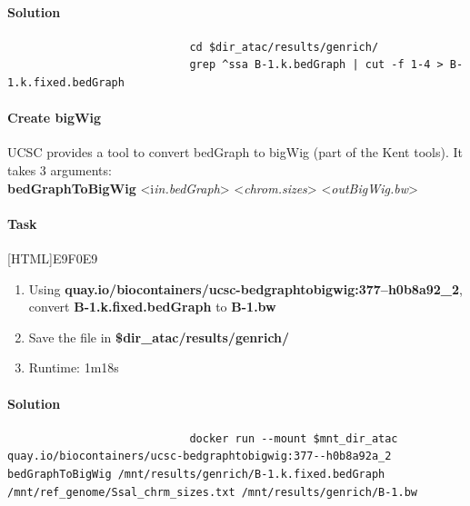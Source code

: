 \documentclass[12pt]{article}
\begin{document}
				\paragraph{Solution}
					
					\begin{minipage}{\linewidth}
						\begin{lstlisting}
							cd $dir_atac/results/genrich/
							grep ^ssa B-1.k.bedGraph | cut -f 1-4 > B-1.k.fixed.bedGraph
						\end{lstlisting}
					\end{minipage}
					
					
			\paragraph{Create bigWig}
					UCSC provides a tool to convert bedGraph to bigWig (part of the Kent tools). It takes 3 arguments:\\
					
					 \textbf{bedGraphToBigWig} <i\textit{in.bedGraph}> <\textit{chrom.sizes}> <\textit{outBigWig.bw}>\\
				
					
				\paragraph{Task}

					[HTML]{E9F0E9}{\parbox{\linewidth}{%
							\begin{enumerate}
								\item  Using \textbf{quay.io/biocontainers/ucsc-bedgraphtobigwig:377--h0b8a92\_2}, convert \textbf{B-1.k.fixed.bedGraph} to \textbf{B-1.bw}
								\item  Save the file in \textbf{\$dir\_atac/results/genrich/}
								\item Runtime: 1m18s
							\end{enumerate}
					}}
					
					\paragraph{Solution}
	
					\begin{minipage}{\linewidth}
						\begin{lstlisting}
							docker run --mount $mnt_dir_atac quay.io/biocontainers/ucsc-bedgraphtobigwig:377--h0b8a92a_2 bedGraphToBigWig /mnt/results/genrich/B-1.k.fixed.bedGraph /mnt/ref_genome/Ssal_chrm_sizes.txt /mnt/results/genrich/B-1.bw
						\end{lstlisting}
					\end{minipage}
		
\end{document}

